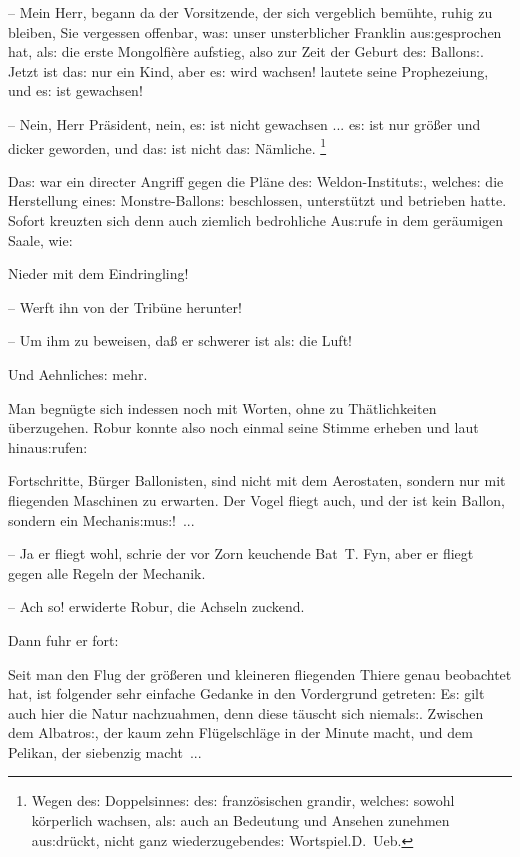\documentclass[oneside,12pt]{book}
\newenvironment{antiqua}{\normalfont}{}
\newcommand{\s}{s:}
\begin{document}
-- Mein Herr, begann da der Vorsitzende, der sich vergeblich
bem\"uhte, ruhig zu bleiben, Sie vergessen offenbar, wa{\s} unser
unsterblicher Franklin au{\s}gesprochen hat, al{\s} die erste
Mongolfi\`ere aufstieg, also zur Zeit der Geburt de{\s} Ballon{\s}.
{\glqq}Jetzt ist da{\s} nur ein Kind, aber e{\s} wird wachsen!{\grqq}
lautete seine Prophezeiung, und e{\s} ist gewachsen!

-- Nein, Herr Pr\"asident, nein, e{\s} ist nicht gewachsen ... e{\s}
ist nur gr\"o{\ss}er und dicker geworden, und da{\s} ist nicht da{\s}
N\"amliche.{\grqq} \footnote[1]{\frakfamily Wegen de{\s} Doppelsinne{\s}
de{\s} franz\"osischen {\glqq}\begin{antiqua}grandir\end{antiqua}{\grqq},
welche{\s} sowohl k\"orperlich wachsen, al{\s} auch an Bedeutung und
Ansehen zunehmen au{\s}dr\"uckt, nicht ganz wiederzugebende{\s}
Wortspiel.\hfill D.~Ueb.}

Da{\s} war ein directer Angriff gegen die Pl\"ane de{\s}
Weldon-Institut{\s}, welche{\s} die Herstellung eine{\s}
Monstre-Ballon{\s} beschlossen, unterst\"utzt und betrieben hatte.
Sofort kreuzten sich denn auch ziemlich bedrohliche Au{\s}rufe in dem
ger\"aumigen Saale, wie:

{\glqq}Nieder mit dem Eindringling!

-- Werft ihn von der Trib\"une herunter!

-- Um ihm zu beweisen, da{\ss} er schwerer ist al{\s} die Luft!{\grqq}

Und Aehnliche{\s} mehr.

Man begn\"ugte sich indessen noch mit Worten, ohne zu Th\"atlichkeiten
\"uberzugehen. Robur konnte also noch einmal seine Stimme erheben und
laut hinau{\s}rufen:

{\glqq}Fortschritte, B\"urger Ballonisten, sind nicht mit dem
Aerostaten, sondern nur mit fliegenden Maschinen zu erwarten. Der
Vogel fliegt auch, und der ist kein Ballon, sondern ein
Mechani{\s}mu{\s}!~...

-- Ja er fliegt wohl, schrie der vor Zorn keuchende Bat~T. Fyn, aber
er fliegt gegen alle Regeln der Mechanik.

-- Ach so!{\grqq} erwiderte Robur, die Achseln zuckend.

Dann fuhr er fort:

{\glqq}Seit man den Flug der gr\"o{\ss}eren und kleineren fliegenden
Thiere genau beobachtet hat, ist folgender sehr einfache Gedanke in
den Vordergrund getreten: E{\s} gilt auch hier die Natur nachzuahmen,
denn diese t\"auscht sich niemal{\s}. Zwischen dem Albatro{\s}, der
kaum zehn Fl\"ugelschl\"age in der Minute macht, und dem Pelikan, der
siebenzig macht~...
\end{document}
